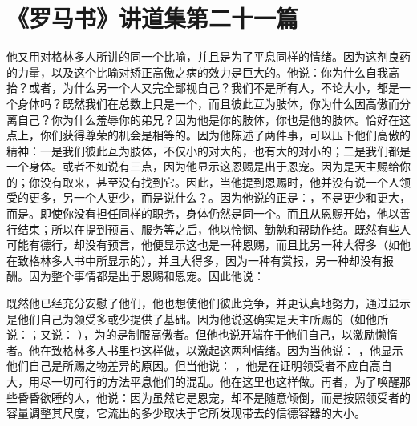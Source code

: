 

\section{《罗马书》讲道集第二十一篇}

\par

\par

他又用对格林多人所讲的同一个比喻，并且是为了平息同样的情绪。因为这剂良药的力量，以及这个比喻对矫正高傲之病的效力是巨大的。他说：你为什么自我高抬？或者，为什么另一个人又完全鄙视自己？我们不是所有人，不论大小，都是一个身体吗？既然我们在总数上只是一个，而且彼此互为肢体，你为什么因高傲而分离自己？你为什么羞辱你的弟兄？因为他是你的肢体，你也是他的肢体。恰好在这点上，你们获得尊荣的机会是相等的。因为他陈述了两件事，可以压下他们高傲的精神：一是我们彼此互为肢体，不仅小的对大的，也有大的对小的；二是我们都是一个身体。或者不如说有三点，因为他显示这恩赐是出于恩宠。因为是天主赐给你的；你没有取来，甚至没有找到它。因此，当他提到恩赐时，他并没有说一个人领受的更多，另一个人更少，而是说什么？。因为他说的正是：，不是更少和更大，而是。即使你没有担任同样的职务，身体仍然是同一个。而且从恩赐开始，他以善行结束；所以在提到预言、服务等之后，他以怜悯、勤勉和帮助作结。既然有些人可能有德行，却没有预言，他便显示这也是一种恩赐，而且比另一种大得多（如他在致格林多人书中所显示的），并且大得多，因为一种有赏报，另一种却没有报酬。因为整个事情都是出于恩赐和恩宠。因此他说：\par

 \par

既然他已经充分安慰了他们，他也想使他们彼此竞争，并更认真地努力，通过显示是他们自己为领受多或少提供了基础。因为他说这确实是天主所赐的（如他所说：；又说： ），为的是制服高傲者。但他也说开端在于他们自己，以激励懒惰者。他在致格林多人书里也这样做，以激起这两种情绪。因为当他说： ，他显示他们自己是所赐之物差异的原因。但当他说： ，他是在证明领受者不应自高自大，用尽一切可行的方法平息他们的混乱。他在这里也这样做。再者，为了唤醒那些昏昏欲睡的人，他说：因为虽然它是恩宠，却不是随意倾倒，而是按照领受者的容量调整其尺度，它流出的多少取决于它所发现带去的信德容器的大小。\par

